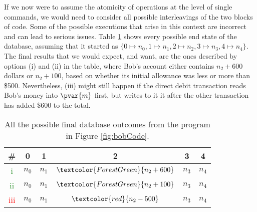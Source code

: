 If we now were to assume the atomicity of operations at the level of single commands, we would need to consider all possible interleavings of the two blocks of code. Some of the possible executions that arise in this context are incorrect and can lead to serious issues. Table \ref{table:bankOutcome} shows every possible end state of the database, assuming that it started as $\{ 0 \mapsto n_0, 1 \mapsto n_1, 2 \mapsto n_2, 3 \mapsto n_3, 4 \mapsto n_4 \}$. The final results that we would expect, and want, are the ones described by options (i) and (ii) in the table, where Bob's account either contains $n_2 + 600$ dollars or $n_2 + 100$, based on whether its initial allowance was less or more than \$500. Nevertheless, (iii) might still happen if the direct debit transaction reads Bob's money into $\pvar{m}$ first, but writes to it it after the other transaction has added \$$600$ to the total.

\bgroup
\setlength{\tabcolsep}{1.5em}
\def\arraystretch{1.5}
\begin{table}[h]
	\centering
	\caption{All the possible final database outcomes from the program in Figure \ref{fig:bobCode}.}
	\label{table:bankOutcome}
	\begin{tabular}{c|c c c c c}
	\hline
	\textbf{\#} & \textbf{0}         & \textbf{1}         & \textbf{2}         & \textbf{3}         & \textbf{4}         \\ \hline
	\textcolor{ForestGreen}{i}   & $n_0 $ & $n_1 $ & $\textcolor{ForestGreen}{n_2 + 600}$     & $n_3 $ & $n_4 $ \\
	\textcolor{ForestGreen}{ii}  & $n_0 $ & $n_1 $ & $\textcolor{ForestGreen}{n_2 + 100}$ & $n_3 $ & $n_4 $ \\
	\textcolor{red}{iii} & $n_0 $ & $n_1 $ & $\textcolor{red}{n_2 - 500}$  & $n_3 $ & $n_4 $ \\ \hline
	\end{tabular}
\end{table}
\egroup


